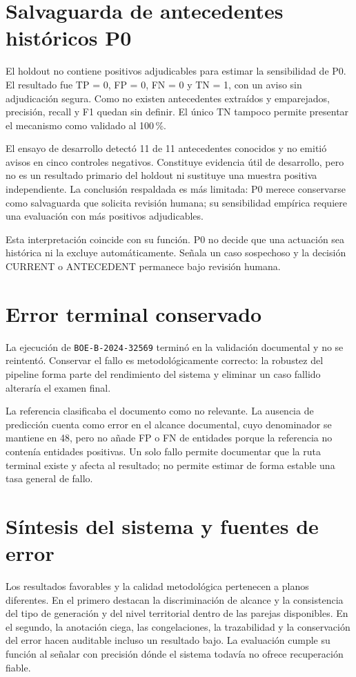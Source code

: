 \section{Salvaguarda de antecedentes históricos P0}
El holdout no contiene positivos adjudicables para estimar la
sensibilidad de P0. El resultado fue TP = 0, FP = 0, FN = 0 y TN = 1, con un
aviso sin adjudicación segura. Como no existen antecedentes extraídos y
emparejados, precisión, recall y F1 quedan sin definir. El único TN tampoco
permite presentar el mecanismo como validado al 100\,\%.

El ensayo de desarrollo detectó 11 de 11 antecedentes conocidos y no emitió
avisos en cinco controles negativos. Constituye evidencia útil de desarrollo,
pero no es un resultado primario del holdout ni sustituye una muestra positiva
independiente. La conclusión respaldada es más limitada: P0 merece conservarse
como salvaguarda que solicita revisión humana; su sensibilidad empírica requiere
una evaluación con más positivos adjudicables.

Esta interpretación coincide con su función. P0 no decide que una actuación
sea histórica ni la excluye automáticamente. Señala un caso sospechoso y la
decisión CURRENT o ANTECEDENT permanece bajo revisión humana.

\section{Error terminal conservado}
La ejecución de \texttt{BOE-B-2024-32569} terminó en la validación documental
y no se reintentó. Conservar el fallo es metodológicamente correcto: la
robustez del pipeline forma parte del rendimiento del sistema y eliminar un
caso fallido alteraría el examen final.

La referencia clasificaba el documento como no relevante. La ausencia de
predicción cuenta como error en el alcance documental, cuyo denominador se
mantiene en 48, pero no añade FP o FN de entidades porque la referencia no
contenía entidades positivas. Un solo fallo permite documentar que la ruta
terminal existe y afecta al resultado; no permite estimar de forma estable
una tasa general de fallo.

\section{Síntesis del sistema y fuentes de error}
Los resultados favorables y la calidad metodológica pertenecen a planos
diferentes. En el primero destacan la discriminación de alcance y la
consistencia del tipo de generación y del nivel territorial dentro de las
parejas disponibles. En el segundo, la anotación ciega, las congelaciones, la
trazabilidad y la conservación del error hacen auditable incluso un resultado
bajo. La evaluación cumple su función al señalar con precisión dónde el
sistema todavía no ofrece recuperación fiable.

